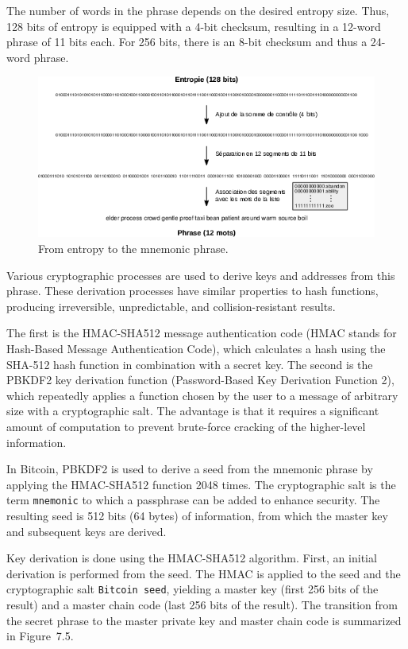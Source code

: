 \documentclass[
  a5paper,
  smalldemyvopaper,10pt,twoside,onecolumn,openright,extrafontsizes,hidelinks]{memoir}
\begin{document}
The number of words in the phrase depends on the desired entropy size.
Thus, 128 bits of entropy is equipped with a 4-bit checksum, resulting
in a 12-word phrase of 11 bits each. For 256 bits, there is an 8-bit
checksum and thus a 24-word phrase.

\begin{figure}

{\centering \includegraphics{chapters/img/from-entropy-to-mnemonic.png}

}

\caption{From entropy to the mnemonic phrase.}

\end{figure}%

Various cryptographic processes are used to derive keys and addresses
from this phrase. These derivation processes have similar properties to
hash functions, producing irreversible, unpredictable, and
collision-resistant results.

The first is the HMAC-SHA512 message authentication code (HMAC stands
for Hash-Based Message Authentication Code), which calculates a hash
using the SHA-512 hash function in combination with a secret key. The
second is the PBKDF2 key derivation function (Password-Based Key
Derivation Function 2), which repeatedly applies a function chosen by
the user to a message of arbitrary size with a cryptographic salt. The
advantage is that it requires a significant amount of computation to
prevent brute-force cracking of the higher-level information.

In Bitcoin, PBKDF2 is used to derive a seed from the mnemonic phrase by
applying the HMAC-SHA512 function 2048 times. The cryptographic salt is
the term \texttt{mnemonic} to which a passphrase can be added to enhance
security. The resulting seed is 512 bits (64 bytes) of information, from
which the master key and subsequent keys are derived.

Key derivation is done using the HMAC-SHA512 algorithm. First, an
initial derivation is performed from the seed. The HMAC is applied to
the seed and the cryptographic salt \texttt{Bitcoin\ seed}, yielding a
master key (first 256 bits of the result) and a master chain code (last
256 bits of the result). The transition from the secret phrase to the
master private key and master chain code is summarized in Figure~7.5.
\end{document}
